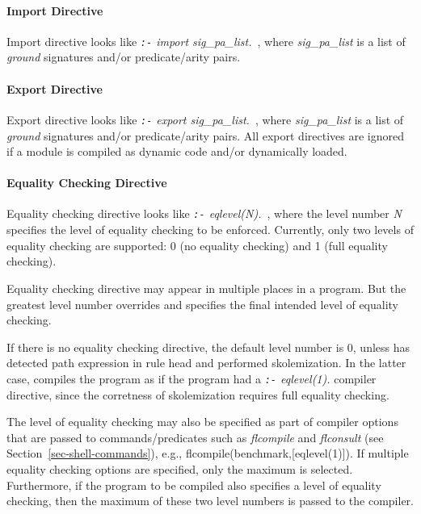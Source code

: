 \documentclass[11pt]{report}
\begin{document}
\paragraph{Import Directive} Import directive looks like
\emph{{\tt :-} import sig\_pa\_list.}\ , where \emph{sig\_pa\_list} is a list of \emph{ground} \fl
signatures \mbox{and/or} \mbox{predicate/arity} pairs.

\paragraph{Export Directive} Export directive looks like
\emph{{\tt :-} export sig\_pa\_list.}\ , where \emph{sig\_pa\_list} is a list of \emph{ground} \fl
signatures \mbox{and/or} \mbox{predicate/arity} pairs. All export directives are ignored if a
\FLORA module is compiled as dynamic code and/or dynamically loaded.

\paragraph{Equality Checking Directive} Equality checking directive looks like
\emph{{\tt :-} eqlevel(N).}\ , where the level number \emph{N} specifies the level of equality
checking to be enforced. Currently, only two levels of equality checking are supported: 0
(no equality checking) and 1 (full equality checking).

Equality checking directive may appear in multiple places in a \FLORA program. But the
greatest level number overrides and specifies the final intended level of equality checking.

If there is no equality checking directive, the default level number is 0, unless \FLORA has
detected path expression in rule head and performed skolemization. In the latter case, \FLORA
compiles the program as if the program had a \emph{{\tt :-} eqlevel(1).} compiler directive,
since the corretness of skolemization requires full equality checking.

The level of equality checking may also be specified as part of compiler options that\linebreak
are passed to commands/predicates such as \emph{flcompile} and \emph{flconsult} (see
Section~\ref{sec-shell-commands}), e.g., \linebreak \mbox{flcompile(benchmark,[eqlevel(1)])}.
If multiple equality checking options are specified, only the maximum is selected. Furthermore,
if the program to be compiled also specifies a level of equality checking, then the maximum of
these two level numbers is passed to the compiler.

\end{document}

